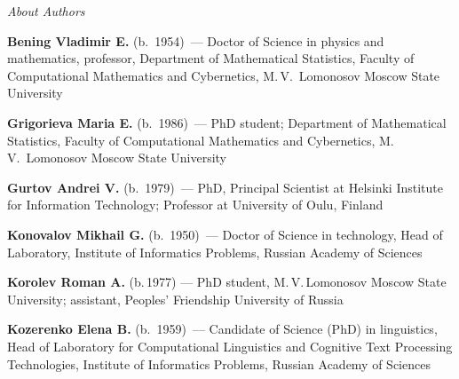 \begin{center}\LARGE
\textit{About Authors}
\end{center}
\thispagestyle{empty}

\vspace*{24pt}

\begin{multicols}{2}




\noindent
\textbf{Bening Vladimir E.} (b.\ 1954)~--- Doctor of Science in physics and mathematics, 
professor, Department of Mathematical Statistics, Faculty of Computational 
Mathematics and Cybernetics, M.\,V.~Lomonosov Moscow State University

\vspace*{3pt}

\noindent
\textbf{Grigorieva Maria E.} (b.\ 1986)~--- PhD student; Department of Mathematical Statistics, 
Faculty of Computational Mathematics and Cybernetics, M.\,V.~Lomonosov Moscow State University

\vspace*{3pt}

\noindent
\textbf{Gurtov Andrei V.} (b.\ 1979)~--- PhD, Principal Scientist at Helsinki Institute
for Information Technology; Professor at University of Oulu, Finland

\vspace*{3pt}

\noindent
\textbf{Konovalov Mikhail G.} (b.\ 1950)~--- Doctor of Science in technology, 
Head of Laboratory, Institute of Informatics Problems,  Russian Academy of Sciences

\vspace*{3pt}

\noindent
\textbf{Korolev Roman A.} (b.\,1977) --- PhD student, 
M.\,V.\,Lomonosov Moscow State University; assistant, Peoples' Friendship
University of Russia

\vspace*{3pt}

\noindent
\textbf{Kozerenko Elena B.} (b.\ 1959)~--- Candidate of Science (PhD) in linguistics, 
Head of Laboratory for Computational Linguistics and Cognitive Text Processing Technologies, 
Institute of Informatics Problems, Russian Academy of Sciences  

\vspace*{3pt}


\end{multicols}

